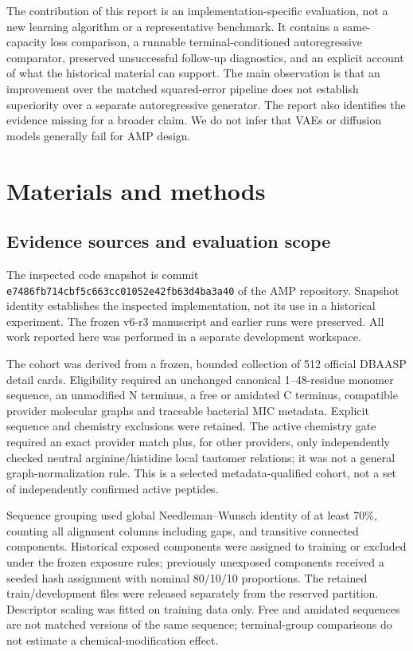 \documentclass[12pt,a4paper]{article}
\begin{document}
The contribution of this report is an implementation-specific evaluation, not a new learning algorithm or a representative benchmark. It contains a same-capacity loss comparison, a runnable terminal-conditioned autoregressive comparator, preserved unsuccessful follow-up diagnostics, and an explicit account of what the historical material can support. The main observation is that an improvement over the matched squared-error pipeline does not establish superiority over a separate autoregressive generator. The report also identifies the evidence missing for a broader claim. We do not infer that VAEs or diffusion models generally fail for AMP design.

\section{Materials and methods}
\subsection{Evidence sources and evaluation scope}
The inspected code snapshot is commit \nolinkurl{e7486fb714cbf5c663cc01052e42fb63d4ba3a40} of the AMP repository. Snapshot identity establishes the inspected implementation, not its use in a historical experiment. The frozen v6-r3 manuscript and earlier runs were preserved. All work reported here was performed in a separate development workspace.

The cohort was derived from a frozen, bounded collection of 512 official DBAASP detail cards. Eligibility required an unchanged canonical 1--48-residue monomer sequence, an unmodified N terminus, a free or amidated C terminus, compatible provider molecular graphs and traceable bacterial MIC metadata. Explicit sequence and chemistry exclusions were retained. The active chemistry gate required an exact provider match plus, for other providers, only independently checked neutral arginine/histidine local tautomer relations; it was not a general graph-normalization rule. This is a selected metadata-qualified cohort, not a set of independently confirmed active peptides.

Sequence grouping used global Needleman--Wunsch identity of at least 70\%, counting all alignment columns including gaps, and transitive connected components. Historical exposed components were assigned to training or excluded under the frozen exposure rules; previously unexposed components received a seeded hash assignment with nominal 80/10/10 proportions. The retained train/development files were released separately from the reserved partition. Descriptor scaling was fitted on training data only. Free and amidated sequences are not matched versions of the same sequence; terminal-group comparisons do not estimate a chemical-modification effect.
\end{document}
